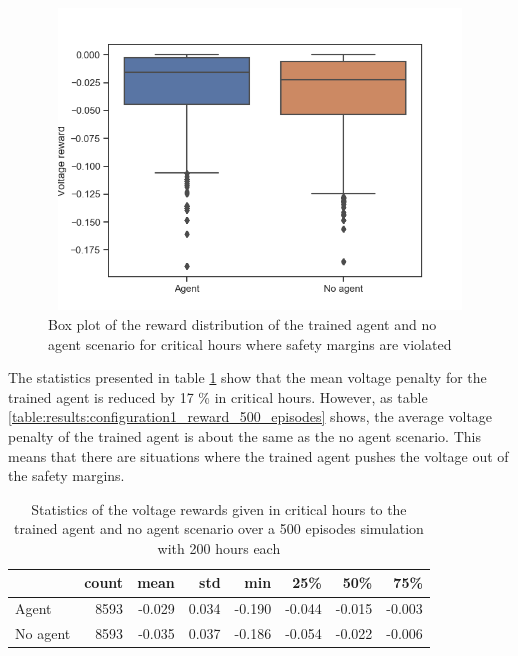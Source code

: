 \documentclass[class=book, crop=false]{standalone}
\begin{document}
\begin{figure}[H]
    \center
\includegraphics[height=8cm, width=12cm]{figures/config1_voltage_boxplot.png}
    \caption[size = 9]{Box plot of the reward distribution of the trained agent and no agent scenario for critical hours where safety margins are violated}
    \label{fig:results:config1_voltage_boxplot}
\end{figure}

The statistics presented in table \ref{table:results:configuration1_reward_500_ep_preventive} show that the mean voltage penalty for the trained agent is reduced by 17 \% in critical hours. However, as table
\ref{table:results:configuration1_reward_500_episodes} shows, the average voltage penalty of the trained agent is about the same as the no agent scenario. This means that there are situations where the trained agent pushes the voltage out of the safety margins.    


\begin{table}[h]
\center
\begin{tabular}{l|rrrrrrr}
         & count & mean   & std   & min    & 25\%   & 50\%   & 75\%   \\
\hline
Agent    & 8593 & -0.029 & 0.034 & -0.190 & -0.044 & -0.015 & -0.003 \\
No agent & 8593 & -0.035 & 0.037 & -0.186 & -0.054 & -0.022 & -0.006 \\
\hline
\end{tabular}
\caption{Statistics of the voltage rewards given in critical hours to the trained agent and no agent scenario over a 500 episodes simulation with 200 hours each}
\label{table:results:configuration1_reward_500_ep_preventive}
\end{table}
\end{document}
